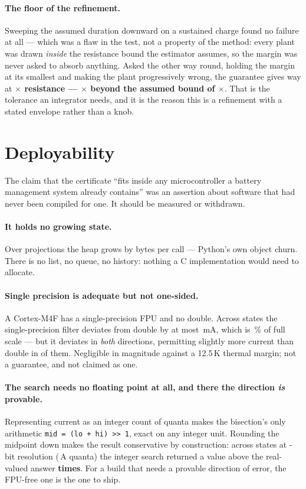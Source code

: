 \documentclass[11pt,letterpaper]{article}
\theoremstyle{definition}
\theoremstyle{remark}
\begin{document}
\paragraph{The floor of the refinement.} Sweeping the assumed
duration downward on a sustained charge found no failure at all --- which was a flaw in the
test, not a property of the method: every plant was drawn \emph{inside} the resistance bound the
estimator assumes, so the margin was never asked to absorb anything. Asked the other way round,
holding the margin at its smallest and making the plant progressively wrong, the guarantee gives
way at \textbf{\mFloorR$\times$ resistance --- \mFloorOver$\times$ beyond the assumed bound of
\mBound$\times$}. That is the tolerance an integrator needs, and it is the reason this is a
refinement with a stated envelope rather than a knob.


\section{Deployability}\label{sec:embedded}

The claim that the certificate ``fits inside any microcontroller a battery management system
already contains'' was an assertion about software that had never been compiled for one. It
should be measured or withdrawn.

\paragraph{It holds no growing state.} Over \embCalls{} projections the heap grows by
\embBytesPerCall{} bytes per call --- Python's own object churn. There is no list, no queue, no
history: nothing a C implementation would need to allocate.

\paragraph{Single precision is adequate but not one-sided.} A Cortex-M4F has a
single-precision FPU and no double. Across \embSpStates{} states the single-precision filter
deviates from double by at most \embSpWorstmA\,mA, which is \embSpFrac\,\% of full scale ---
but it deviates in \emph{both} directions, permitting slightly more current than double in
\embSpLooseCount{} of them. Negligible in magnitude against a 12.5\,K thermal margin; not a
guarantee, and not claimed as one.

\paragraph{The search needs no floating point at all, and there the direction \emph{is}
provable.} Representing current as an integer count of quanta makes the bisection's only
arithmetic \texttt{mid = (lo + hi) >> 1}, exact on any integer unit. Rounding the midpoint down
makes the result conservative by construction: across \embIntStates{} states at
\embIntBits{}-bit resolution (\embIntQuantum\,A quanta) the integer search returned a value
above the real-valued answer \textbf{\embIntAbove{} times}. For a build that needs a provable
direction of error, the FPU-free one is the one to ship.
\end{document}
